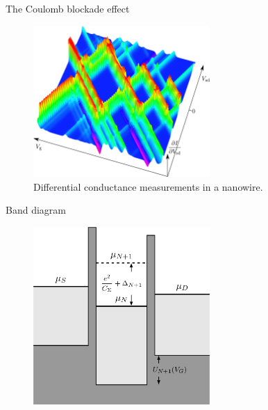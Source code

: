 \documentclass[10pt, compress, usetitleprogressbar, protectframetitle]{beamer}
\begin{document}
\begin{frame}{The Coulomb blockade effect}
	
	\begin{figure}
		\includegraphics[width=0.6\textwidth]{diff_cond}
		\caption{Differential conductance measurements in a nanowire.}
	\end{figure}	
	
\end{frame}

\begin{frame}{Band diagram}

	\begin{figure}
		\includegraphics[width=0.6\textwidth]{SET_a}
	\end{figure}	
	
	
\end{frame}
\end{document}
